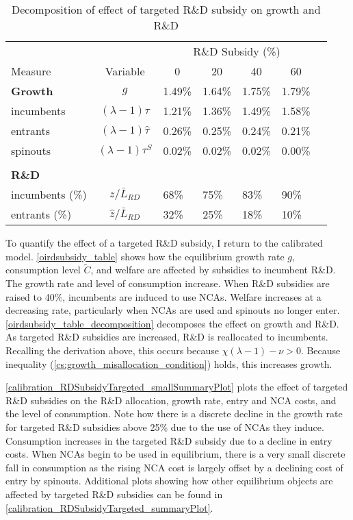 \documentclass[11pt,english]{article}
\theoremstyle{definition}
\begin{document}
\begin{table}
	\centering
	\caption{Decomposition of effect of targeted R\&D subsidy on growth and R\&D}\label{oirdsubsidy_table_decomposition}
	\begin{tabular}{lclllll}
		\toprule \toprule
		&  & \multicolumn{4}{c}{R\&D Subsidy (\%)} \vspace{3pt} \tabularnewline
		Measure & Variable & \multicolumn{1}{c}{0} & \multicolumn{1}{c}{20} & \multicolumn{1}{c}{40} & \multicolumn{1}{c}{60}\tabularnewline
		\midrule
		\textbf{Growth} & $g$ & 1.49\% & 1.64\% & 1.75\% & 1.79\% 
		\tabularnewline
		\multicolumn{1}{l}{\quad incumbents} & $(\lambda -1) \tau$ & 1.21\% & 1.36\% & 1.49\% & 1.58\% \tabularnewline
		\multicolumn{1}{l}{\quad entrants} & $(\lambda - 1) \hat{\tau}$ & 0.26\% & 0.25\% & 0.24\% & 0.21\% \tabularnewline
		\multicolumn{1}{l}{\quad spinouts} & $(\lambda - 1) \tau^S$ & 0.02\% & 0.02\% & 0.02\% & 0.00\% \tabularnewline \tabularnewline
		\textbf{R\&D} & &  &  &  & \tabularnewline
		\multicolumn{1}{l}{\quad incumbents (\%)} & $z / \bar{L}_{RD}$ & 68\% & 75\% & 83\% & 90\% \tabularnewline
		\multicolumn{1}{l}{\quad entrants (\%)} & $\hat{z} / \bar{L}_{RD}$ & 32\% & 25\% & 18\% & 10\% \tabularnewline
		\bottomrule
	\end{tabular}
\end{table}

To quantify the effect of a targeted R\&D subsidy, I return to the calibrated model. \autoref{oirdsubsidy_table} shows how the equilibrium growth rate $g$, consumption level $\tilde{C}$, and welfare are affected by subsidies to incumbent R\&D. The growth rate and level of consumption increase. When R\&D subsidies are raised to 40\%, incumbents are induced to use NCAs. Welfare increases at a decreasing rate, particularly when NCAs are used and spinouts no longer enter. \autoref{oirdsubsidy_table_decomposition} decomposes the effect on growth and R\&D. As targeted R\&D subsidies are increased, R\&D is reallocated to incumbents. Recalling the derivation above, this occurs because $\chi(\lambda -1 ) - \nu > 0$. Because inequality (\ref{cs:growth_misallocation_condition}) holds, this increases growth.

\autoref{calibration_RDSubsidyTargeted_smallSummaryPlot} plots the effect of targeted R\&D subsidies on the R\&D allocation, growth rate, entry and NCA costs, and the level of consumption. Note how there is a discrete decline in the growth rate for targeted R\&D subsidies above 25\% due to the use of NCAs they induce. Consumption increases in the targeted R\&D subsidy due to a decline in entry costs. When NCAs begin to be used in equilibrium, there is a very small discrete fall in consumption as the rising NCA cost is largely offset by a declining cost of entry by spinouts. Additional plots showing how other equilibrium objects are affected by targeted R\&D subsidies can be found in \autoref{calibration_RDSubsidyTargeted_summaryPlot}.
\end{document}
